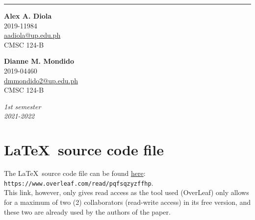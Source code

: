 \documentclass{article}
\begin{document}
\begin{center}
\vfill

\rule{\textwidth}{0.4pt}
\vfill
\begin{multicols}{2}

\begin{center}
    \textbf{Alex A. Diola}\\
    2019-11984\\
    \href{mailto:aadiola@up.edu.ph}{aadiola@up.edu.ph}\\
    CMSC 124-B\\
\end{center}

\columnbreak

\begin{center}
    \textbf{Dianne M. Mondido}\\
    2019-04460\\
    \href{mailto:dmmondido2@up.edu.ph}{dmmondido2@up.edu.ph}\\
    CMSC 124-B\\
\end{center}
\end{multicols}


\vfill

\par
\textit{1st semester}\\
\textit{2021-2022}
\end{center}

\pagebreak

\renewcommand{\contentsname}{Table of Contents} %
\tableofcontents

\setlength{\parskip}{1em} %

\pagebreak

\section*{\LaTeX\ source code file}


The \LaTeX\ source code file can be found \href{https://www.overleaf.com/read/pqfsqzyzffhp}{here}:\\
\texttt{https://www.overleaf.com/read/pqfsqzyzffhp}.\\This link, however, only gives read access as the tool used (OverLeaf) only allows for a maximum of two (2) collaborators (read-write access) in its free version, and these two are already used by the authors of the paper.
\end{document}

